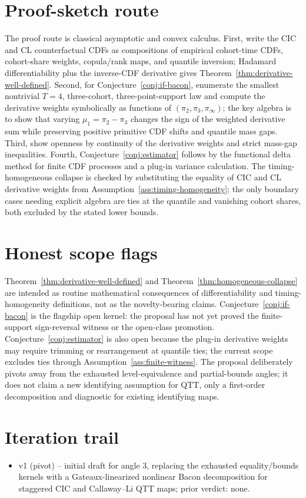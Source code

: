 \documentclass[11pt]{article}
\theoremstyle{definition}
\theoremstyle{plain}
\theoremstyle{remark}
\begin{document}
\section{Proof-sketch route}
The proof route is classical asymptotic and convex calculus.  First, write the CIC and CL counterfactual CDFs as compositions of empirical cohort-time CDFs, cohort-share weights, copula/rank maps, and quantile inversion; Hadamard differentiability plus the inverse-CDF derivative gives Theorem~\ref{thm:derivative-well-defined}.  Second, for Conjecture~\ref{conj:if-bacon}, enumerate the smallest nontrivial \(T=4\), three-cohort, three-point-support law and compute the derivative weights symbolically as functions of \((\pi_2,\pi_3,\pi_\infty)\); the key algebra is to show that varying \(\mu_1=\pi_2-\pi_3\) changes the sign of the weighted derivative sum while preserving positive primitive CDF shifts and quantile mass gaps.  Third, show openness by continuity of the derivative weights and strict mass-gap inequalities.  Fourth, Conjecture~\ref{conj:estimator} follows by the functional delta method for finite CDF processes and a plug-in variance calculation.  The timing-homogeneous collapse is checked by substituting the equality of CIC and CL derivative weights from Assumption~\ref{ass:timing-homogeneity}; the only boundary cases needing explicit algebra are ties at the quantile and vanishing cohort shares, both excluded by the stated lower bounds.

\section{Honest scope flags}
Theorem~\ref{thm:derivative-well-defined} and Theorem~\ref{thm:homogeneous-collapse} are intended as routine mathematical consequences of differentiability and timing-homogeneity definitions, not as the novelty-bearing claims.  Conjecture~\ref{conj:if-bacon} is the flagship open kernel: the proposal has not yet proved the finite-support sign-reversal witness or the open-class promotion.  Conjecture~\ref{conj:estimator} is also open because the plug-in derivative weights may require trimming or rearrangement at quantile ties; the current scope excludes ties through Assumption~\ref{ass:finite-witness}.  The proposal deliberately pivots away from the exhausted level-equivalence and partial-bounds angles; it does not claim a new identifying assumption for QTT, only a first-order decomposition and diagnostic for existing identifying maps.

\section{Iteration trail}
\begin{itemize}[leftmargin=*]
\item v1 (pivot) -- initial draft for angle 3, replacing the exhausted equality/bounds kernels with a Gateaux-linearized nonlinear Bacon decomposition for staggered CIC and Callaway--Li QTT maps; prior verdict: none.
\end{itemize}
\end{document}
